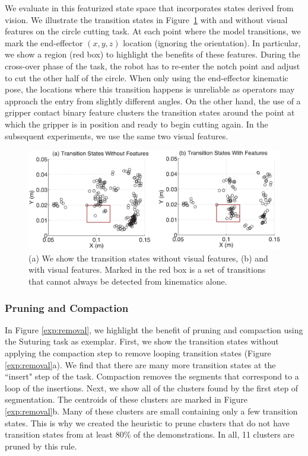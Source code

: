 We evaluate \tsc in this featurized state space that incorporates states derived from vision.
We illustrate the transition states in Figure~\ref{exp:cop} with and without visual features on the circle cutting task.
 At each point where the model transitions, we mark the end-effector $(x,y,z)$ location (ignoring the orientation).
 In particular, we show a region (red box) to highlight the benefits of these features.
During the cross-over phase of the task, the robot has to re-enter the notch point and adjust to cut the other half of the circle.
When only using the end-effector kinematic pose, the locations where this transition happens is unreliable as operators may approach the entry from slightly different angles.
On the other hand, the use of a gripper contact binary feature clusters the transition states around the point at which the gripper is in position and ready to begin cutting again.
In the subsequent experiments, we use the same two visual features.

\begin{figure}[t]
\centering
  \includegraphics[width=\columnwidth]{tsc-experiments/exp1_e_state.eps}
 \caption{(a) We show the transition states without visual features, (b) and with visual features. Marked in the red box is a set of transitions that cannot always be detected from kinematics alone. 
 \label{exp:cop}}
\end{figure}
\fi


\subsubsection{Pruning and Compaction} \label{sec:pruningCompaction}
In Figure \ref{exp:removal}, we highlight the benefit of pruning and compaction using the Suturing task as exemplar.
First, we show the transition states without applying the compaction step to remove looping transition states (Figure \ref{exp:removal}a).
We find that there are many more transition states at the ``insert" step of the task.
Compaction removes the segments that correspond to a loop of the insertions.
Next, we show all of the clusters found by the first step of segmentation.
The centroids of these clusters are marked in Figure \ref{exp:removal}b.
Many of these clusters are small containing only a few transition states. 
This is why we created the heuristic to prune clusters that do not have transition states from at least 80\% of the demonstrations.
In all, 11 clusters are pruned by this rule.

